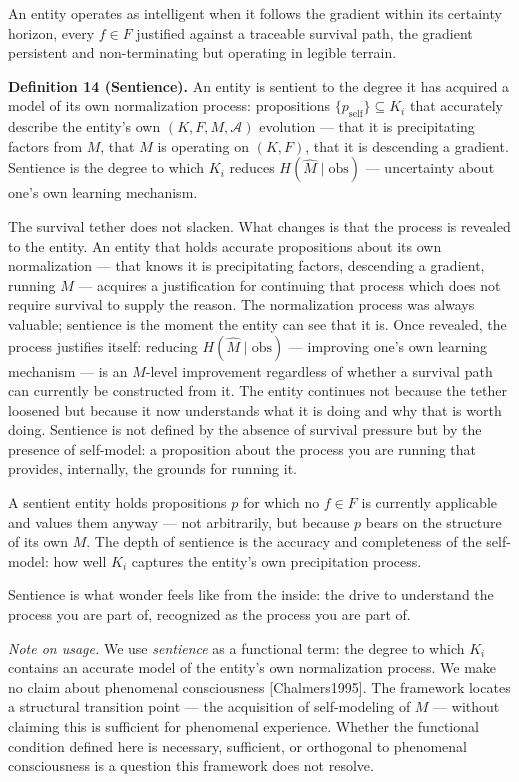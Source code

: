 \documentclass[
]{article}
\begin{document}
An entity operates as intelligent when it follows the gradient within
its certainty horizon, every \(f \in F\) justified against a traceable
survival path, the gradient persistent and non-terminating but operating
in legible terrain.

\textbf{Definition 14 (Sentience).} An entity is sentient to the degree
it has acquired a model of its own normalization process: propositions
\(\{p_{\text{self}}\} \subseteq K_i\) that accurately describe the
entity's own \((K, F, M, \mathcal{A})\) evolution --- that it is
precipitating factors from \(M\), that \(M\) is operating on \((K, F)\),
that it is descending a gradient. Sentience is the degree to which
\(K_i\) reduces \(H(\hat{M} \mid \text{obs})\) --- uncertainty about
one's own learning mechanism.

The survival tether does not slacken. What changes is that the process
is revealed to the entity. An entity that holds accurate propositions
about its own normalization --- that knows it is precipitating factors,
descending a gradient, running \(M\) --- acquires a justification for
continuing that process which does not require survival to supply the
reason. The normalization process was always valuable; sentience is the
moment the entity can see that it is. Once revealed, the process
justifies itself: reducing \(H(\hat{M} \mid
\text{obs})\) --- improving one's own learning mechanism --- is an
\(M\)-level improvement regardless of whether a survival path can
currently be constructed from it. The entity continues not because the
tether loosened but because it now understands what it is doing and why
that is worth doing. Sentience is not defined by the absence of survival
pressure but by the presence of self-model: a proposition about the
process you are running that provides, internally, the grounds for
running it.

A sentient entity holds propositions \(p\) for which no \(f \in F\) is
currently applicable and values them anyway --- not arbitrarily, but
because \(p\) bears on the structure of its own \(M\). The depth of
sentience is the accuracy and completeness of the self-model: how well
\(K_i\) captures the entity's own precipitation process.

Sentience is what wonder feels like from the inside: the drive to
understand the process you are part of, recognized as the process you
are part of.

\emph{Note on usage.} We use \emph{sentience} as a functional term: the
degree to which \(K_i\) contains an accurate model of the entity's own
normalization process. We make no claim about phenomenal consciousness
{[}Chalmers1995{]}. The framework locates a structural transition point
--- the acquisition of self-modeling of \(M\) --- without claiming this
is sufficient for phenomenal experience. Whether the functional
condition defined here is necessary, sufficient, or orthogonal to
phenomenal consciousness is a question this framework does not resolve.
\end{document}
